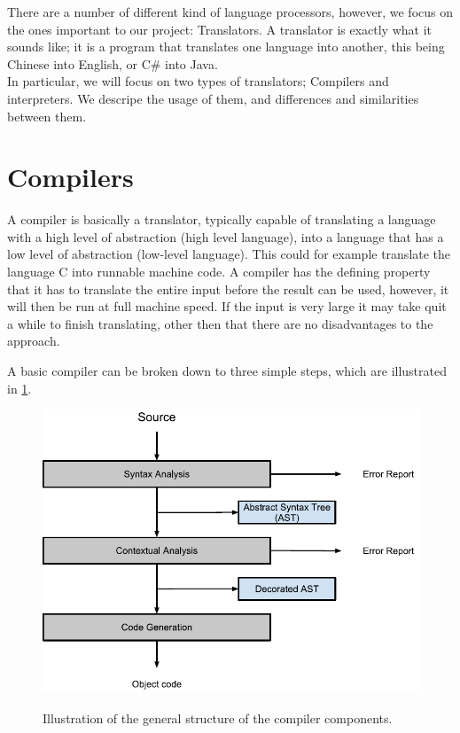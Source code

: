 There are a number of different kind of language processors, however, we focus on the ones important to our project: Translators. A translator is exactly what it sounds like; it is a program that translates one language into another, this being Chinese into English, or C\# into Java. \\ \indent 
   In particular, we will focus on two types of translators; Compilers and interpreters. We descripe the usage of them, and differences and similarities between them.

\section{Compilers}
A compiler is basically a translator, typically capable of translating a language with a high level of abstraction (high level language), into a language that has a low level of abstraction (low-level language). This could for example translate the language C into runnable machine code. A compiler has the defining property that it has to translate the entire input before the result can be used, however, it will then be run at full machine speed. If the input is very large it may take quit a while to finish translating, other then that there are no disadvantages to the approach.\\ \indent

A basic compiler can be broken down to three simple steps, which are illustrated in \ref{fig:compiler}.

\begin{figure}[H]
\begin{center}
\includegraphics[scale=0.5]{Images/compiler_drawing.png}
\label{fig:compiler}
\caption{Illustration of the general structure of the compiler components.}
\end{center}
\end{figure}


